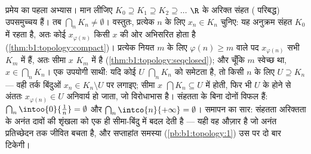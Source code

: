 \begin{example}[नेस्टेड संहत समुच्चय]\label{ex:b1:topology:nested}
प्रमेय का पहला अभ्यास। मान लीजिए $K_0 \supseteq K_1 \supseteq K_2 \supseteq
\dots$ $\R$ के अरिक्त संहत ( परिबद्ध) उपसमुच्चय हैं। तब $\bigcap_n K_n
\neq \emptyset$। वस्तुतः, प्रत्येक $n$ के लिए $x_n \in K_n$ चुनिए: यह
अनुक्रम संहत $K_0$ में रहता है, अतः कोई  $x_{\varphi(n)}$ किसी $x$
की ओर अभिसरित होता है (\cref{thm:b1:topology:compact})। प्रत्येक नियत $m$ के
लिए $\varphi(n) \geq m$ वाले पद $x_{\varphi(n)}$ सभी  $K_m$ में
हैं, अतः सीमा $x$ $K_m$ में है (\cref{thm:b1:topology:seqclosed}); और चूँकि
$m$ स्वेच्छ था, $x \in \bigcap_n K_n$। एक उपयोगी साथी: यदि कोई 
$U$ $\bigcap_n K_n$ को समेटता है, तो किसी $n$ के लिए $U \supseteq K_n$ ---
वही तर्क बिंदुओं $x_n \in K_n \setminus U$ पर लगाइए; सीमा $x$ $\bigcap K_n
\subseteq U$ में होती, फिर भी $U$ के  होने से अंततः $x_{\varphi(n)} \in
U$ अनिवार्य हो जाता, जो विरोधाभास है। संहतता के बिना दोनों  विफल हैं:
$\bigcap_n \intoo{0}{\frac 1n} = \emptyset$ और $\bigcap_n \intco{n}{+\infty}
= \emptyset$। समापन का सार: संहतता अरिक्तता के अनंत दावों की शृंखला को एक ही
सीमा-बिंदु में बदल देती है --- यही वह औज़ार है जो अनंत प्रतिच्छेदन तक जीवित
बचता है, और सप्ताहांत समस्या (\cref{pb:b1:topology:1}) उस पर दो बार टिकेगी।
\end{example}

